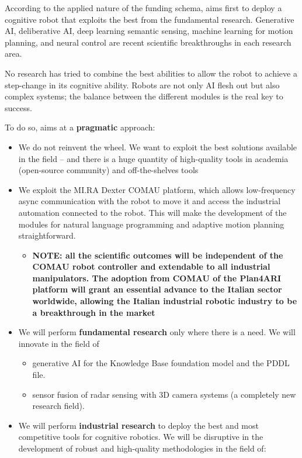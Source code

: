 According to the applied nature of the funding schema, 
aims first to deploy a cognitive robot that exploits the best from the
fundamental research. Generative AI, deliberative AI, deep learning
semantic sensing, machine learning for motion planning, and neural
control are recent scientific breakthroughs in each research area.

No research has tried to combine the best abilities to allow the robot
to achieve a step-change in its cognitive ability. Robots are not only
AI flesh out but also complex systems; the balance between the different
modules is the real key to success.

To do so,  aims at a \textbf{pragmatic} approach:

\begin{itemize}
\item
  We do not reinvent the wheel. We want to exploit the best solutions
  available in the field -- and there is a huge quantity of high-quality
  tools in academia (open-source community) and off-the-shelves tools
\item
  We exploit the MI.RA Dexter COMAU platform, which allows low-frequency
  async communication with the robot to move it and access the
  industrial automation connected to the robot. This will make the
  development of the modules for natural language programming and
  adaptive motion planning straightforward.

  \begin{itemize}
  \item
    \textbf{NOTE: all the scientific outcomes will be independent of the
    COMAU robot controller and extendable to all industrial
    manipulators. The adoption from COMAU of the Plan4ARI platform will
    grant an essential advance to the Italian sector worldwide, allowing
    the Italian industrial robotic industry to be a breakthrough in the
    market}
  \end{itemize}
\item
  We will perform \textbf{fundamental research} only where there is a
  need. We will innovate in the field of

  \begin{itemize}
  \item
    generative AI for the Knowledge Base foundation model and the PDDL
    file.
  \item
    sensor fusion of radar sensing with 3D camera systems (a completely
    new research field).
  \end{itemize}
\item
  We will perform \textbf{industrial research} to deploy the best and
  most competitive tools for cognitive robotics. We will be disruptive
  in the development of robust and high-quality methodologies in the
  field of:


\end{itemize}
